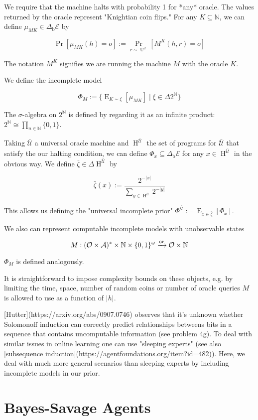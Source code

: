 \documentclass[a4paper]{article}
\newcommand{\Bool}{\{0,1\}}
\newcommand{\Sagas}{{\Bool^\omega}}
\DeclareMathOperator{\Prb}{Pr}
\DeclareMathOperator{\E}{E}
\DeclareMathOperator{\Un}{U}
\newcommand{\Nats}{\mathbb{N}}
\newcommand{\Abs}[1]{\lvert #1 \rvert}
\newcommand{\Or}{\xrightarrow{\textnormal{or}}}
\newcommand{\UTM}{\mathcal{U}}
\newcommand{\SP}[1]{\Delta #1}
\newcommand{\Act}{\mathcal{A}}
\newcommand{\Per}{\mathcal{O}}
\newcommand{\His}{(\Per \times \Act)^*}
\newcommand{\Env}{\mathcal{E}}
\newcommand{\Beh}{\Delta_{\operatorname{b}}}
\newcommand{\EnvB}{\Beh\Env}
\newcommand{\ProgS}{\operatorname{H}^{\bar{\UTM}}}
\begin{document}
We require that the machine halts with probability 1 for *any* oracle. The values returned by the oracle represent "Knightian coin flips." For any ${K \subseteq \Nats}$, we can define ${\mu_{MK} \in \EnvB}$ by

$${\Prb[\mu_{MK}(h)=o]:=\Prb_{r \sim \Un^\omega}[M^K(h,r)=o]}$$

The notation ${M^K}$ signifies we are running the machine ${M}$ with the oracle ${K}$. 

We define the incomplete model 

$${\Phi_M :=\{\E_{K \sim \xi}[\mu_{MK}] \mid \xi \in \SP{2^{\Nats}}\}}$$

The ${\sigma}$-algebra on ${2^\Nats}$ is defined by regarding it as an infinite product: ${2^\Nats \cong \prod_{n \in \Nats} \Bool}$.

Taking ${\bar{\UTM}}$ a universal oracle machine and ${\ProgS}$ the set of programs for ${\bar{\UTM}}$ that satisfy the our halting condition, we can define ${\Phi_x \subseteq \EnvB}$ for any ${x \in \ProgS}$ in the obvious way. We define ${\bar{\zeta} \in \Delta \ProgS}$ by

$${\bar{\zeta}(x):=\frac{2^{-\Abs{x}}}{\sum_{y \in \ProgS} 2^{-\Abs{y}}}}$$

This allows us defining the "universal incomplete prior" ${\Phi^{\bar{\UTM}}:=\E_{x \in \bar{\zeta}}[\Phi_x]}$.

We also can represent computable incomplete models with unobservable states

$${M: \His \times \Nats \times \Sagas \Or \Per \times \Nats}$$

${\Phi_M}$ is defined analogously.

It is straightforward to impose complexity bounds on these objects, e.g. by limiting the time, space, number of random coins or number of oracle queries ${M}$ is allowed to use as a function of ${\Abs{h}}$.

[Hutter](https://arxiv.org/abs/0907.0746) observes that it's unknown whether Solomonoff induction can correctly predict relationships betweens bits in a sequence that contains uncomputable information (see problem 4g). To deal with similar issues in online learning one can use "sleeping experts" (see also [subsequence induction](https://agentfoundations.org/item?id=482)). Here, we deal with much more general scenarios than sleeping experts by including incomplete models in our prior.

\section{Bayes-Savage Agents}
\end{document}
